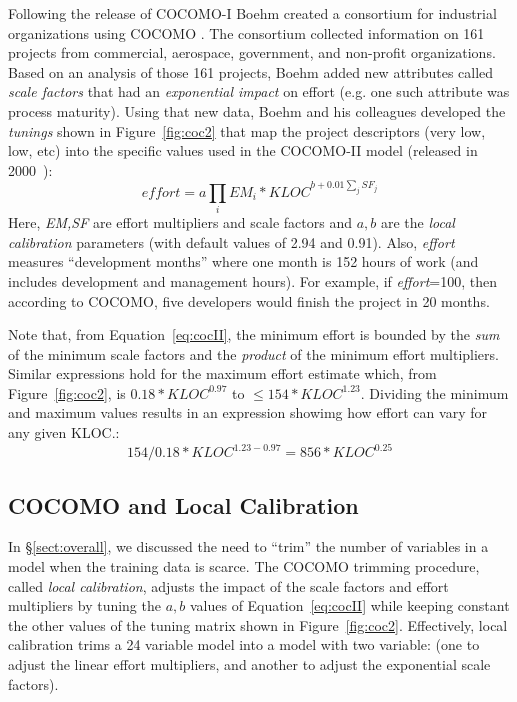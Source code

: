 \documentclass{sig-alternate}
\newcommand{\tion}[1]{\S\ref{sect:#1}}
\newcommand{\fig}[1]{Figure~\ref{fig:#1}}
\newcommand{\eq}[1]{Equation~\ref{eq:#1}}
\begin{document}
Following the release of COCOMO-I Boehm created a consortium for
industrial organizations using COCOMO .
The consortium
collected information on 161 projects from commercial,
aerospace, government, and non-profit organizations.
Based on an analysis of those 161 projects, Boehm
 added  new attributes called {\em scale factors}
that had an {\em exponential impact}
on effort (e.g. one such attribute was process maturity).
Using that new data, Boehm and his colleagues developed
the  {\em tunings} shown in \fig{coc2} that
map the project descriptors (very low, low, etc)
into the specific values used in the COCOMO-II model
(released in 2000~\cite{boehm00b}):
\begin{equation}\label{eq:cocII}
\mathit{effort}=a\prod_i EM_i *\mathit{KLOC}^{b+0.01\sum_j SF_j}
\end{equation}
Here, {\em EM,SF} are  effort multipliers and scale
factors and
 $a,b$ are the {\em local calibration} parameters (with default values of 2.94 and 0.91).
Also, {\em effort}
measures ``development months'' where one month
is 152 hours of work  (and includes development and management hours).
For example, if {\em effort}=100, then according to COCOMO,
five developers would finish
the project in 20 months.



Note that, from \eq{cocII},
the minimum  
effort  is bounded by the  {\em sum} of the minimum scale factors
and the {\em product} of the minimum effort multipliers.
Similar expressions hold for the  maximum effort estimate which,
from \fig{coc2}, is
$0.18*\mathit{KLOC}^{0.97}$ to $\le 154*\mathit{KLOC}^{1.23}$.
Dividing the minimum and maximum values results in an  expression showimg
how    effort can vary for any given KLOC.: 
\begin{equation}\label{eq:ration}
154/0.18 *\mathit{KLOC}^{1.23 - 0.97} = 856*\mathit{KLOC}^{0.25}
\end{equation}
 



 
\subsection{COCOMO and Local Calibration}\label{sect:coconut}
In \tion{overall}, we discussed the need to ``trim'' the number
of variables in a model when the  training data is scarce.
The COCOMO trimming procedure, called   {\em local calibration}, adjusts the impact of the scale factors and effort
multipliers by tuning the  $a,b$ values of Equation~\ref{eq:cocII}
while keeping constant the other values of the tuning matrix
shown in \fig{coc2}. Effectively, local calibration trims
a 24 variable model
into a model with two variable: (one  to adjust the linear effort
multipliers, and another to adjust the exponential scale factors).
\end{document}
